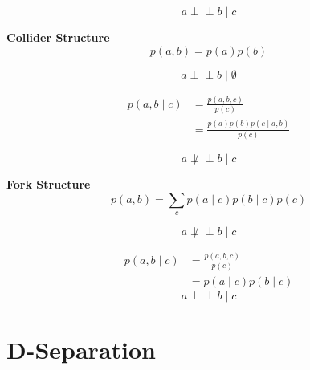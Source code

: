 \documentclass{article}
\def\ci{\perp\!\!\!\perp}
\begin{document}
\begin{equation}
    a  \ci b \mid c
\end{equation}

\textbf{Collider Structure}
\begin{equation}
    p(a, b)=p(a) p(b)
\end{equation}

\begin{equation}
    a \ci b \mid \emptyset
\end{equation}

\begin{equation}
    \begin{aligned}
    p(a, b \mid c) &=\frac{p(a, b, c)}{p(c)} \\
    &=\frac{p(a) p(b) p(c \mid a, b)}{p(c)}
    \end{aligned}
\end{equation}

\begin{equation}
    a \not \ci b \mid c
\end{equation}

\textbf{Fork Structure}
\begin{equation}
    p(a, b)=\sum_{c} p(a \mid c) p(b \mid c) p(c)
\end{equation}

\begin{equation}
    a \not \ci b \mid c
\end{equation}


\begin{equation}
    \begin{aligned}
    p(a, b \mid c) &=\frac{p(a, b, c)}{p(c)} \\
    &=p(a \mid c) p(b \mid c)
    \end{aligned}
\end{equation}
\begin{equation}
    a \ci b \mid c
\end{equation}

\section{D-Separation}





\appendix
\end{document}
